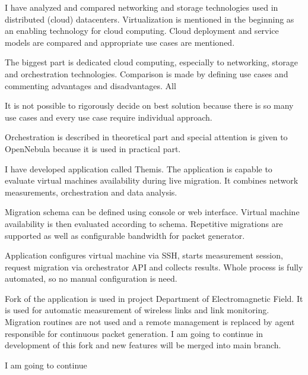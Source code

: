 
I have analyzed and compared networking and storage technologies used in distributed (cloud) datacenters. Virtualization is mentioned in the beginning as an enabling technology for cloud computing. Cloud deployment and service models are compared and appropriate use cases are mentioned.

The biggest part is dedicated cloud computing, especially to networking, storage and orchestration technologies. Comparison is made by defining use cases and commenting advantages and disadvantages. All


It is not possible to rigorously decide on best solution because there is so many use cases and every use case require individual approach.




Orchestration is described in theoretical part and special attention is given to OpenNebula because it is used in practical part. 





\hrulefill


I have developed application called Themis. The application is capable to evaluate virtual machines availability during live migration. It combines network measurements, orchestration and data analysis.

Migration schema can be defined using console or web interface. Virtual machine availability is then evaluated according to schema. Repetitive migrations are supported as well as configurable bandwidth for packet generator. 


Application configures virtual machine via \Ac{SSH}, starts measurement session, request migration via orchestrator \Ac{API} and collects results. Whole process is fully automated, so no manual configuration is need. 





Fork of the application is used in project Department of Electromagnetic Field. It is used for automatic measurement of wireless links and link monitoring. Migration routines are not used and a remote management is replaced by agent responsible for continuous packet generation. I am going to continue in development of this fork and new features will be merged into main branch.

I am going to continue 


